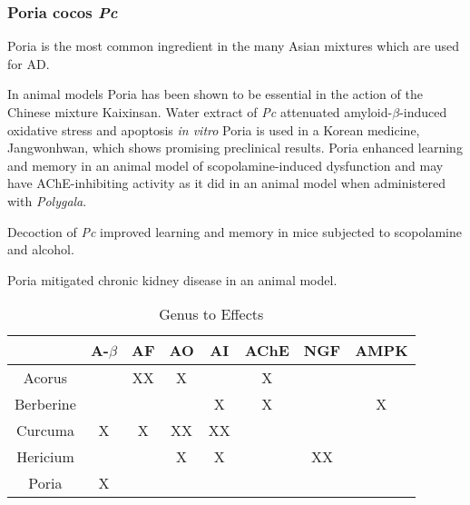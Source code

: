 \subsubsection{Poria cocos \textit{Pc}}

Poria is the most common ingredient in the
many Asian mixtures which are used for AD.

In animal models Poria has been shown to be essential
in the action of the Chinese mixture Kaixinsan.
\cite{gao2010comparision}
Water extract of \textit{Pc} attenuated
amyloid-$\beta$-induced oxidative stress and apoptosis
\textit{in vitro}
\cite{park2009poria}
Poria is used in a Korean medicine, Jangwonhwan,
which shows promising preclinical results.
\cite{seo2010modified,
seo2010oriental}
Poria enhanced learning and memory in an animal
model of scopolamine-induced dysfunction
\cite{zhang2012effects}
and may have AChE-inhibiting activity
as it did in an animal model when administered with
\textit{Polygala}.
\cite{li2011experimental}

Decoction of \textit{Pc} improved learning and memory
in mice subjected to scopolamine and alcohol.
\cite{zhang2012effects}

Poria mitigated chronic kidney disease in an animal model.
\cite{zhao2013urinary}







\begin{table*}[htp]
\centering

\begin{tabular}{||c c c c c c c c||}
 \hline
                & A-$\beta$ & AF & AO & AI & AChE & NGF & AMPK \\
 \hline\hline
 Acorus         &           & XX &  X &    &   X  &     &      \\
 Berberine      &           &    &    & X  &   X  &     &  X   \\
 Curcuma        &     X     & X  & XX & XX &      &     &      \\
 Hericium       &           &    &  X &  X &      &  XX &      \\
 Poria          &     X     &    &    &    &      &     &      \\
 \hline
\end{tabular}
\caption{Genus to Effects}
\label{table:effects}
\end{table*}



%




